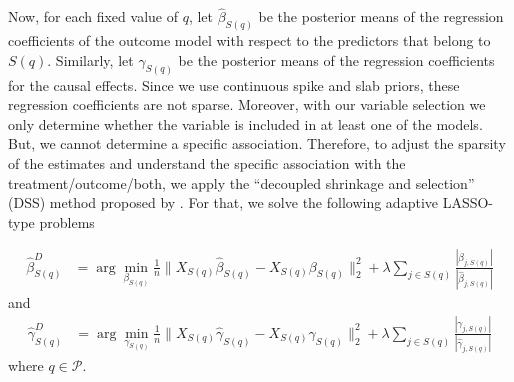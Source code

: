 \documentclass[preprint,12pt]{elsarticle}
\begin{document}
Now, for each fixed value of $q$, let $\hat{\beta}_{S(q)}$ be the posterior means 
of the regression coefficients of the outcome model with respect to
the predictors that belong to $S(q)$. Similarly,
let $\hat{\gamma}_{S(q)}$ be the posterior means of the regression
coefficients for the causal effects. Since we use continuous 
spike and slab priors, these regression coefficients are not sparse.
Moreover, with our variable selection we only determine whether the variable 
is included in at least one of the models. But, we cannot determine a specific 
association. Therefore, to adjust the sparsity of the estimates and understand
the specific association with the treatment/outcome/both, we apply the 
``decoupled shrinkage and selection'' (DSS) method proposed by \citep{hahn2015}. 
For that, we solve the following adaptive LASSO-type \citep{Zou2006}
problems

\begin{align}
	\hat{\beta}^D_{S(q)} &= 
	\arg\min_{\beta_{S(q)}} \frac{1}{n}\|X_{S(q)}\hat{\beta}_{S(q)}
	- X_{S(q)} \beta_{S(q)}\|_2^2 + \lambda\sum_{j\in S(q)} 
	\frac{|\beta_{j,S(q)}|}{|\hat{\beta}_{j,S(q)}|}
\end{align}
and
\begin{align}
	\hat{\gamma}^D_{S(q)} &= 
	\arg\min_{\gamma_{S(q)}} \frac{1}{n}\|X_{S(q)}\hat{\gamma}_{S(q)}
	- X_{S(q)} \gamma_{S(q)}\|_2^2 + \lambda\sum_{j\in S(q)} 
	\frac{|\gamma_{j,S(q)}|}{|\hat{\gamma}_{j,S(q)}|}
\end{align}
where $q\in \mathcal{P}$.

\end{document}
